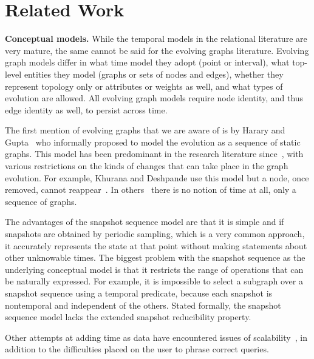 \section{Related Work}
\label{sec:related}

{\bf Conceptual models.}  While the temporal models in the relational
literature are very mature, the same cannot be said for the evolving
graphs literature.  Evolving graph models differ in what time model
they adopt (point or interval), what top-level entities they model
(graphs or sets of nodes and edges), whether they represent topology
only or attributes or weights as well, and what types of evolution are
allowed.  All evolving graph models require node identity, and thus
edge identity as well, to persist across time.

The first mention of evolving graphs that we are aware of is by Harary
and Gupta~\cite{Harary1997} who informally proposed to model the
evolution as a sequence of static graphs.  This model has been predominant in the
research literature
since~\cite{Ferreira2004,Kan2009,Khurana2013,Lerman2010,Ren2011,Semertzidis2015},
with various restrictions on the kinds of changes that can take place
in the graph evolution.  For example, Khurana and Deshpande use this
model but a node, once removed, cannot reappear~\cite{Khurana2013}.
In others~\cite{Labouseur2015,Ren2011} there is no notion of time at all,
only a sequence of graphs.  

The advantages of the snapshot sequence model are that it is simple
and if snapshots are obtained by periodic sampling, which is a very
common approach, it accurately represents the state at that point
without making statements about other unknowable times.  The biggest
problem with the snapshot sequence as the underlying conceptual model
is that it restricts the range of operations that can be naturally
expressed.  For example, it is impossible to select a subgraph over a
snapshot sequence using a temporal predicate, because each snapshot is
nontemporal and independent of the others.  Stated formally, the
snapshot sequence model lacks the extended snapshot reducibility
property.

Other attempts at adding time as data have encountered issues of
scalability~\cite{Cattuto2013}, in addition to the difficulties placed
on the user to phrase correct queries.

